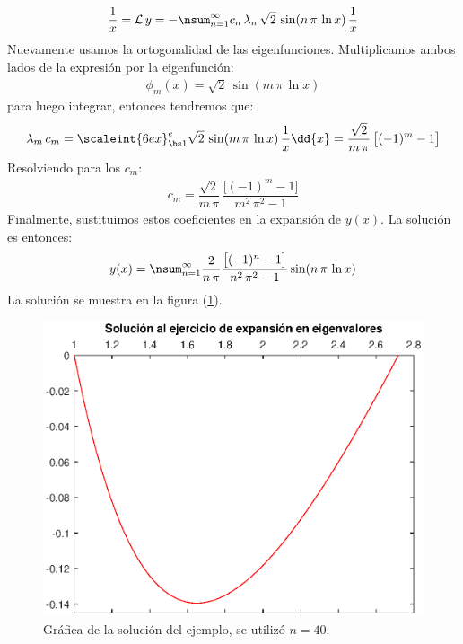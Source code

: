 \begin{ejemplo}
\begin{align*}
\dfrac{1}{x} = \mathcal{L} \, y = - \nsum_{n=1}^{\infty} c_{n} \, \lambda_{n} \, \sqrt{2} \, \sin (n \, \pi \, \ln x) \, \dfrac{1}{x}
\end{align*}
Nuevamente usamos la ortogonalidad de las eigenfunciones. Multiplicamos ambos lados de la expresión por la eigenfunción:
\begin{align*}
\phi_{m} (x) = \sqrt{2} \, \sin (m \, \pi \, \ln x)
\end{align*}
para luego integrar, entonces tendremos que:
\begin{align*}
\lambda_{m} \, c_{m} = \scaleint{6ex}_{\bs 1}^{e} \sqrt{2} \, \sin (m \, \pi \, \ln x) \, \dfrac{1}{x} \dd{x} = \dfrac{\sqrt{2}}{m \, \pi} \, \big[ (-1)^{m} - 1 \big]
\end{align*}
Resolviendo para los $c_{m}$:
\begin{align*}
c_{m} = \dfrac{\sqrt{2}}{m \, \pi} \, \dfrac{\big[ (-1)^{m} - 1 \big]}{m^{2} \, \pi^{2} - 1}
\end{align*}
Finalmente, sustituimos estos coeficientes en la expansión de $y (x)$. La solución es entonces:
\begin{align*}
y (x) = \nsum_{n=1}^{\infty} \dfrac{2}{n \, \pi} \dfrac{\big[ (-1)^{n} - 1 \big]}{n^{2} \, \pi^{2} - 1} \sin (n \, \pi \, \ln x)
\end{align*}
La solución se muestra en la figura (\ref{fig:figura_04_03}).
\begin{figure}[H]
    \centering
    \includegraphics[scale=1]{Imagenes/Expansion_Eigenfunciones_02.eps}
    \caption{Gráfica de la solución del ejemplo, se utilizó $n = 40$.}
    \label{fig:figura_04_03}
\end{figure}
\end{ejemplo}

